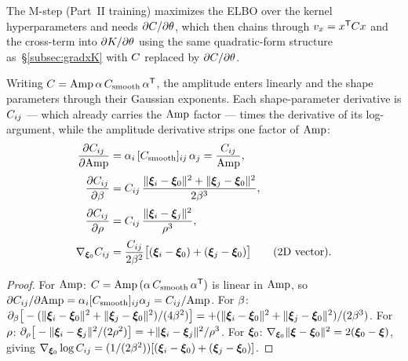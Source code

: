 The M-step (Part~II training) maximizes the ELBO over the kernel hyperparameters and
needs $\partial C/\partial\theta$, which then chains through
$v_x=x^{\mathsf{T}}C x$ and the cross-term into $\partial K/\partial\theta$
using the same quadratic-form structure as~\S\ref{subsec:gradxK} with $C$
replaced by $\partial C/\partial\theta$.

\begin{proposition}
Writing $C=\mathrm{Amp}\,\alpha\,C_{\mathrm{smooth}}\,\alpha^{\mathsf{T}}$, the amplitude enters linearly and
the shape parameters through their Gaussian exponents. Each shape-parameter
derivative is $C_{ij}$ --- which already carries the $\mathrm{Amp}$ factor --- times the
derivative of its log-argument, while the amplitude derivative strips one factor of
$\mathrm{Amp}$:
\begin{equation}
\label{eq:dCtheta}
\begin{aligned}
\frac{\partial C_{ij}}{\partial\mathrm{Amp}}
&=\alpha_i\,[C_{\mathrm{smooth}}]_{ij}\,\alpha_j=\frac{C_{ij}}{\mathrm{Amp}},\\[2pt]
\frac{\partial C_{ij}}{\partial\beta}
&=C_{ij}\,\frac{\lVert\bm{\xi}_i-\bm{\xi}_{0}\rVert^2+\lVert\bm{\xi}_j-\bm{\xi}_{0}\rVert^2}{2\beta^3},\\[2pt]
\frac{\partial C_{ij}}{\partial\rho}
&=C_{ij}\,\frac{\lVert\bm{\xi}_i-\bm{\xi}_j\rVert^2}{\rho^3},\\[2pt]
\nabla_{\bm{\xi}_{0}}C_{ij}
&=\frac{C_{ij}}{2\beta^2}\big[(\bm{\xi}_i-\bm{\xi}_{0})+(\bm{\xi}_j-\bm{\xi}_{0})\big]\qquad(\text{2D vector}).
\end{aligned}
\end{equation}
\end{proposition}

\begin{proof}
For $\mathrm{Amp}$: $C=\mathrm{Amp}\,(\alpha\,C_{\mathrm{smooth}}\,\alpha^{\mathsf{T}})$ is linear in $\mathrm{Amp}$, so
$\partial C_{ij}/\partial\mathrm{Amp}=\alpha_i[C_{\mathrm{smooth}}]_{ij}\alpha_j=C_{ij}/\mathrm{Amp}$. For $\beta$:
$\partial_\beta\big[-(\lVert\bm{\xi}_i-\bm{\xi}_{0}\rVert^2+\lVert\bm{\xi}_j-\bm{\xi}_{0}\rVert^2)/(4\beta^2)\big]
=+(\lVert\bm{\xi}_i-\bm{\xi}_{0}\rVert^2+\lVert\bm{\xi}_j-\bm{\xi}_{0}\rVert^2)/(2\beta^3)$. For $\rho$:
$\partial_\rho\big[-\lVert\bm{\xi}_i-\bm{\xi}_j\rVert^2/(2\rho^2)\big]=+\lVert\bm{\xi}_i-\bm{\xi}_j\rVert^2/\rho^3$.
For $\bm{\xi}_{0}$: $\nabla_{\bm{\xi}_{0}}\lVert\bm{\xi}-\bm{\xi}_{0}\rVert^2=2(\bm{\xi}_{0}-\bm{\xi})$, giving
$\nabla_{\bm{\xi}_{0}}\log C_{ij}=(1/(2\beta^2))[(\bm{\xi}_i-\bm{\xi}_{0})+(\bm{\xi}_j-\bm{\xi}_{0})]$.
\end{proof}

